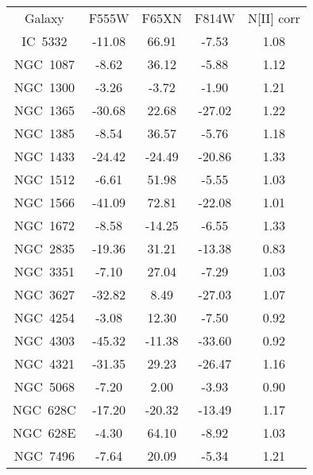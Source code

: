 \begin{table}
\begin{tabular}{ccccc}
Galaxy & F555W & F65XN & F814W & N[II] corr \\
IC~5332 & -11.08 & 66.91 & -7.53 & 1.08 \\
NGC~1087 & -8.62 & 36.12 & -5.88 & 1.12 \\
NGC~1300 & -3.26 & -3.72 & -1.90 & 1.21 \\
NGC~1365 & -30.68 & 22.68 & -27.02 & 1.22 \\
NGC~1385 & -8.54 & 36.57 & -5.76 & 1.18 \\
NGC~1433 & -24.42 & -24.49 & -20.86 & 1.33 \\
NGC~1512 & -6.61 & 51.98 & -5.55 & 1.03 \\
NGC~1566 & -41.09 & 72.81 & -22.08 & 1.01 \\
NGC~1672 & -8.58 & -14.25 & -6.55 & 1.33 \\
NGC~2835 & -19.36 & 31.21 & -13.38 & 0.83 \\
NGC~3351 & -7.10 & 27.04 & -7.29 & 1.03 \\
NGC~3627 & -32.82 & 8.49 & -27.03 & 1.07 \\
NGC~4254 & -3.08 & 12.30 & -7.50 & 0.92 \\
NGC~4303 & -45.32 & -11.38 & -33.60 & 0.92 \\
NGC~4321 & -31.35 & 29.23 & -26.47 & 1.16 \\
NGC~5068 & -7.20 & 2.00 & -3.93 & 0.90 \\
NGC~628C & -17.20 & -20.32 & -13.49 & 1.17 \\
NGC~628E & -4.30 & 64.10 & -8.92 & 1.03 \\
NGC~7496 & -7.64 & 20.09 & -5.34 & 1.21 \\
\end{tabular}
\end{table}
